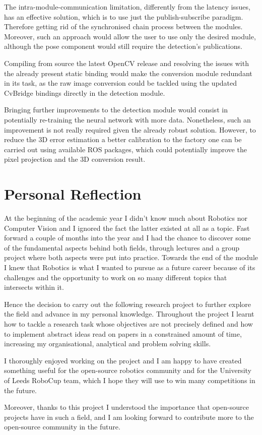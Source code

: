 The intra-module-communication limitation, differently from the latency issues, has an effective solution, which is to use just the publish-subscribe paradigm. Therefore getting rid of the synchronised chain process between the modules. Moreover, such an approach would allow the user to use only the desired module, although the pose component would still require the detection's publications.

Compiling from source the latest OpenCV release and resolving the issues with the already present static binding would make the conversion module redundant in its task, as the raw image conversion could be tackled using the updated CvBridge bindings directly in the detection module.

Bringing further improvements to the detection module would consist in potentially re-training the neural network with more data. Nonetheless, such an improvement is not really required given the already robust solution. However, to reduce the 3D error estimation a better calibration to the factory one can be carried out using available ROS packages, which could potentially improve the pixel projection and the 3D conversion result.

\section{Personal Reflection}

At the beginning of the academic year I didn't know much about Robotics nor Computer Vision and I ignored the fact the latter existed at all as a topic. Fast forward a couple of months into the year and I had the chance to discover some of the fundamental aspects behind both fields, through lectures and a group project where both aspects were put into practice. Towards the end of the module I knew that Robotics is what I wanted to pursue as a future career because of its challenges and the opportunity to work on so many different topics that intersects within it.

Hence the decision to carry out the following research project to further explore the field and advance in my personal knowledge. Throughout the project I learnt how to tackle a research task whose objectives are not precisely defined and how to implement abstract ideas read on papers in a constrained amount of time, increasing my organisational, analytical and problem solving skills.

I thoroughly enjoyed working on the project and I am happy to have created something useful for the open-source robotics community and for the University of Leeds RoboCup team, which I hope they will use to win many competitions in the future.

Moreover, thanks to this project I understood the importance that open-source projects have in such a field, and I am looking forward to contribute more to the open-source community in the future.





